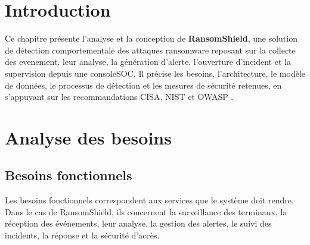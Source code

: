 
{}
\section*{Introduction}

Ce chapitre présente l'analyse et la conception de \textbf{RansomShield}, une solution de détection comportementale des attaques ransomware reposant sur la collecte des \gls{evenement}, leur analyse, la génération d'\gls{alerte}, l'ouverture d'\gls{incident} et la supervision depuis une \gls{consoleSOC}. Il précise les besoins, l'architecture, le modèle de données, le processus de détection et les mesures de sécurité retenues, en s'appuyant sur les recommandations CISA, NIST et OWASP \cite{cisaStopRansomware2023,nistRansomwareProfile2025,owaspRestSecurity,owaspApiSecurity}.

\section{Analyse des besoins}

\subsection{Besoins fonctionnels}

Les besoins fonctionnels correspondent aux services que le système doit rendre. Dans le cas de RansomShield, ils concernent la surveillance des terminaux, la réception des événements, leur analyse, la gestion des alertes, le suivi des incidents, la réponse et la sécurité d'accès.

